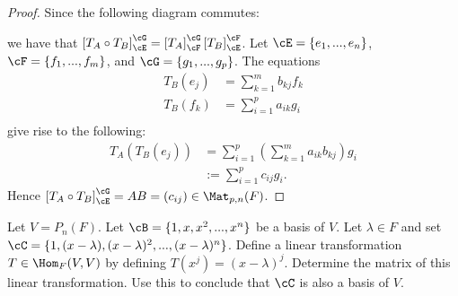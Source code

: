 \documentclass[10pt,twoside,openany]{memoir}
\begin{document}
    \begin{proof}
        Since the following diagram commutes:
            \begin{center}
            \end{center}
        we have that $\left[ T_A \circ T_B \right]_\cE ^ \cG = \left[ T_A \right]_\cF ^\cG \left[ T_B \right]_\cE ^ \cF$. Let $\cE = \{e_1,...,e_n\}$, $\cF = \{f_1,...,f_m\}$, and $\cG = \{g_1,...,g_p\}$. The equations
            \begin{equation*}
            \begin{split}
                T_B(e_j) &= \sum_{k = 1}^m b_{kj}f_k \\
                T_B(f_k) &= \sum_{i = 1}^p a_{ik}g_i \\
            \end{split}
            \end{equation*}
        give rise to the following:
            \begin{equation*}
            \begin{split}
                T_A(T_B(e_j)) &= \sum_{i=1}^p\left(\sum_{k=1}^m a_{ik}b_{kj}\right)g_i \\
                & := \sum_{i=1}^pc_{ij}g_i.
            \end{split}
            \end{equation*}
        Hence $\left[ T_A \circ T_B \right]_\cE ^ \cG = AB = (c_{ij}) \in \Mat_{p,n}(F)$.
    \end{proof}
    \newpage
    \begin{exercise}
        Let $V = P_n(F)$. Let $\cB = \{1,x,x^2,...,x^n\}$ be a basis of $V$. Let $\lambda \in F$ and set \newline$\cC = \{1 , (x-\lambda), (x-\lambda)^2,...,(x-\lambda)^n\}$. Define a linear transformation $T \in \Hom_F{(V,V)}$ by defining $T(x^j) = (x-\lambda)^j$. Determine the matrix of this linear transformation. Use this to conclude that $\cC$ is also a basis of $V$.
    \end{exercise}
\end{document}

